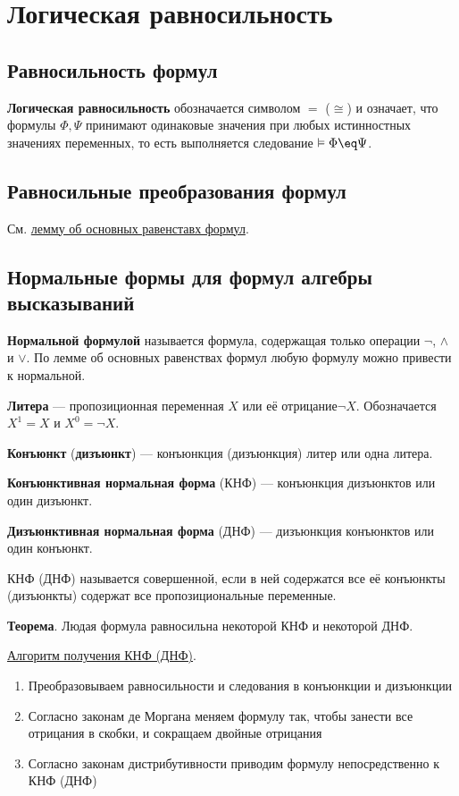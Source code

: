 \section{Логическая равносильность}
\subsection{Равносильность формул}
\dftion \textbf{Логическая равносильность} обозначается символом $=$ ($\cong$) и означает, что формулы $\Phi, \Psi$ принимают одинаковые значения при любых истинностных значениях переменных, то есть выполняется следование $\vDash \Phi \eq \Psi$.
\subsection{Равносильные преобразования формул}
См. \hyperref[q1:lemma]{лемму об основных равенставх формул}.
\subsection{Нормальные формы для формул алгебры высказываний}
\dftion \textbf{Нормальной формулой} называется формула, содержащая только операции $\lnot$, $\land$ и $\lor$. По лемме об основных равенствах формул любую формулу можно привести к нормальной.

\dftion \textbf{Литера} --- пропозиционная переменная $X$ или её отрицание$\lnot X$. Обозначается $X^1=X$ и $X^0=\lnot X$.

\dftion \textbf{Конъюнкт} (\textbf{дизъюнкт}) --- конъюнкция (дизъюнкция) литер или одна литера.

\dftion \textbf{Конъюнктивная нормальная форма} (КНФ) --- конъюнкция дизъюнктов или один дизъюнкт.


\dftion \textbf{Дизъюнктивная нормальная форма} (ДНФ) --- дизъюнкция конъюнктов или один конъюнкт.

КНФ (ДНФ) называется совершенной, если в ней содержатся все её конъюнкты (дизъюнкты) содержат все пропозициональные переменные.

\textbf{Теорема}. Людая формула равносильна некоторой КНФ и некоторой ДНФ.

\underline{Алгоритм получения КНФ (ДНФ)}.
\begin{enumerate}
    \item Преобразовываем равносильности и следования в конъюнкции и дизъюнкции
    \item Согласно законам де Моргана меняем формулу так, чтобы занести все отрицания в скобки, и сокращаем двойные отрицания
    \item Согласно законам дистрибутивности приводим формулу непосредственно к КНФ (ДНФ)
\end{enumerate}

